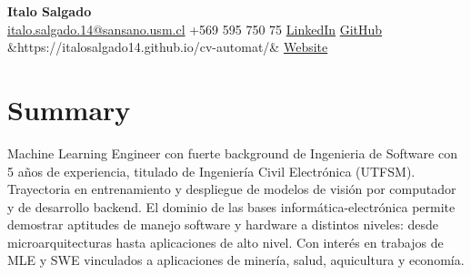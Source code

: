 \documentclass[11pt, letterpaper]{article}
\newcommand{\cvperson}[6]{%
  \begin{center}
    {\LARGE\bfseries\color{accent} #1}\\[4pt]
    {\small
      \href{mailto:#2}{#2}
      \enspace\textbar\enspace
      #3
      \enspace\textbar\enspace
      \href{#4}{LinkedIn}
      \enspace\textbar\enspace
      \href{#5}{GitHub}%
      \ifx&#6&\else
        \enspace\textbar\enspace\href{#6}{Website}%
      \fi
    }
  \end{center}
}
\begin{document}
\cvperson
  {Italo Salgado}
  {italo.salgado.14@sansano.usm.cl}
  {+569 595 750 75}
  {https://www.linkedin.com/in/italo-salgado-910764192/}
  {https://github.com/italosalgado14}
  {https://italosalgado14.github.io/cv-automat/}
\section{Summary}
Machine Learning Engineer con fuerte background de Ingenieria de Software con 5 años de experiencia, 
titulado de Ingeniería Civil Electrónica (UTFSM). 
Trayectoria en entrenamiento y despliegue de modelos de visión por computador y de desarrollo backend.
El dominio de las bases informática-electrónica permite demostrar aptitudes de manejo software y 
hardware a distintos niveles: desde microarquitecturas hasta aplicaciones de alto nivel.
Con interés en trabajos de MLE y SWE vinculados a aplicaciones de minería, salud, aquicultura y economía.
\end{document}
